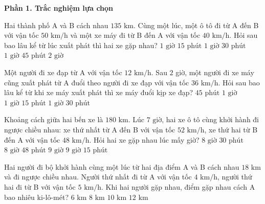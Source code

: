 \textbf{Phần 1. Trắc nghiệm lựa chọn}

\begin{ex} %
Hai thành phố A và B cách nhau $135\text{ km}$. Cùng một lúc, một ô tô đi từ A đến B với vận tốc $50\text{ km/h}$ và một xe máy đi từ B đến A với vận tốc $40\text{ km/h}$. Hỏi sau bao lâu kể từ lúc xuất phát thì hai xe gặp nhau?
\choice
{$1\text{ giờ } 15\text{ phút}$}
{\True $1\text{ giờ } 30\text{ phút}$}
{$1\text{ giờ } 45\text{ phút}$}
{$2\text{ giờ}$}
\end{ex}

\begin{ex} %
Một người đi xe đạp từ A với vận tốc $12\text{ km/h}$. Sau $2$ giờ, một người đi xe máy cũng xuất phát từ A đuổi theo người đi xe đạp với vận tốc $36\text{ km/h}$. Hỏi sau bao lâu kể từ khi xe máy xuất phát thì xe máy đuổi kịp xe đạp?
\choice
{$45\text{ phút}$}
{\True $1\text{ giờ}$}
{$1\text{ giờ } 15\text{ phút}$}
{$1\text{ giờ } 30\text{ phút}$}
\end{ex}

\begin{ex} %
Khoảng cách giữa hai bến xe là $180\text{ km}$. Lúc $7\text{ giờ}$, hai xe ô tô cùng khởi hành đi ngược chiều nhau: xe thứ nhất từ A đến B với vận tốc $52\text{ km/h}$, xe thứ hai từ B đến A với vận tốc $48\text{ km/h}$. Hỏi hai xe gặp nhau lúc mấy giờ?
\choice
{$8\text{ giờ } 30\text{ phút}$}
{\True $8\text{ giờ } 48\text{ phút}$}
{$9\text{ giờ}$}
{$9\text{ giờ } 15\text{ phút}$}
\end{ex}

\begin{ex} %
Hai người đi bộ khởi hành cùng một lúc từ hai địa điểm A và B cách nhau $18\text{ km}$ và đi ngược chiều nhau. Người thứ nhất đi từ A với vận tốc $4\text{ km/h}$, người thứ hai đi từ B với vận tốc $5\text{ km/h}$. Khi hai người gặp nhau, điểm gặp nhau cách A bao nhiêu ki-lô-mét?
\choice
{$6\text{ km}$}
{\True $8\text{ km}$}
{$10\text{ km}$}
{$12\text{ km}$}
\end{ex}

